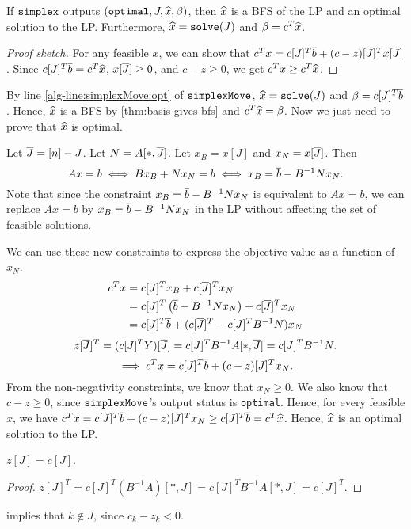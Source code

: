 \begin{theorem}
\label{thm:simplex-optimal}
If $\operatorname{\mathtt{simplex}}$ outputs $(\mathtt{optimal}, J, \widehat{x}, \beta)$,
then $\widehat{x}$ is a BFS of the LP and an optimal solution to the LP.
Furthermore, $\widehat{x} = \operatorname{\mathtt{solve}}(J)$ and $\beta = c^T\widehat{x}$.
\end{theorem}
\begin{proof}[Proof sketch]
For any feasible $x$, we can show that $c^Tx = c[J]^T\overline{b} + (c-z)[\overline{J}]^Tx[\overline{J}]$.
Since $c[J]^T\overline{b} = c^T\widehat{x}$, $x[\overline{J}] \ge 0$, and $c - z \ge 0$,
we get $c^Tx \ge c^T\widehat{x}$.
\end{proof}
\begin{longProof}
By line \ref{alg-line:simplexMove:opt} of $\operatorname{\mathtt{simplexMove}}$,
$\widehat{x} = \operatorname{\mathtt{solve}}(J)$ and $\beta = c[J]^T\overline{b}$.
Hence, $\widehat{x}$ is a BFS by \cref{thm:basis-gives-bfs} and $c^T\widehat{x} = \beta$.
Now we just need to prove that $\widehat{x}$ is optimal.

Let $\overline{J} = [n] - J$. Let $N = A[*,\overline{J}]$.
Let $x_B = x[J]$ and $x_N = x[\overline{J}]$. Then
\[ Ax = b \iff Bx_B + Nx_N = b \iff x_B = \overline{b} - B^{-1}Nx_N. \]
Note that since the constraint $x_B = \overline{b} - B^{-1}Nx_N$ is equivalent to $Ax = b$,
we can replace $Ax = b$ by $x_B = \overline{b} - B^{-1}Nx_N$ in the LP without affecting
the set of feasible solutions.

We can use these new constraints to express the objective value as a function of $x_N$.
\begin{align*}
c^Tx &= c[J]^Tx_B + c[\overline{J}]^Tx_N
\\ &= c[J]^T\left(\overline{b} - B^{-1}Nx_N\right) + c[\overline{J}]^Tx_N
\\ &= c[J]^T\overline{b} + (c[\overline{J}]^T - c[J]^TB^{-1}N)x_N
\end{align*}
\[ z[\overline{J}]^T = (c[J]^TY)[\overline{J}] = c[J]^TB^{-1}A[*,\overline{J}] = c[J]^TB^{-1}N. \]
\[ \implies c^Tx = c[J]^T\overline{b} + (c-z)[\overline{J}]^Tx_N. \]
From the non-negativity constraints, we know that $x_N \ge 0$.
We also know that $c-z \ge 0$, since $\operatorname{\mathtt{simplexMove}}$'s output status is \texttt{optimal}.
Hence, for every feasible $x$, we have
$c^Tx = c[J]^T\overline{b} + (c-z)[\overline{J}]^Tx_N \ge c[J]^T\overline{b} = c^T\widehat{x}$.
Hence, $\widehat{x}$ is an optimal solution to the LP.
\end{longProof}

\begin{lemma}
\label{thm:zJ-eq-cJ}
$z[J] = c[J]$.
\end{lemma}
\begin{proof}
$z[J]^T = c[J]^T(B^{-1}A)[*,J] = c[J]^TB^{-1}A[*,J] = c[J]^T$.
\end{proof}
 implies that $k \not\in J$, since $c_k - z_k < 0$.

